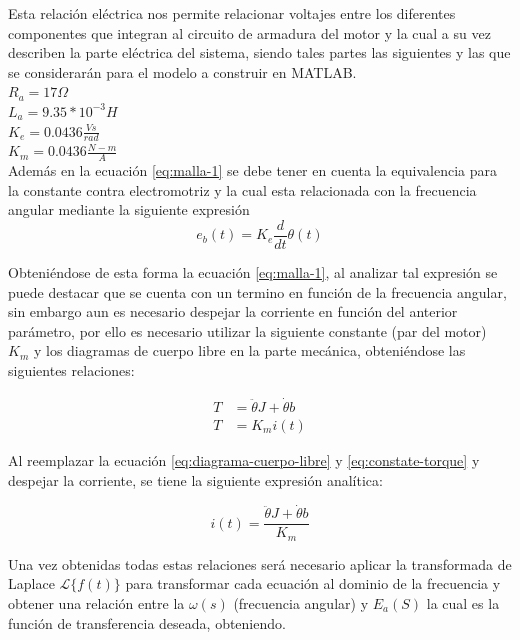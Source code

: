 \documentclass[conference]{IEEEtran}
\begin{document}
	Esta relación eléctrica nos permite relacionar voltajes entre los diferentes componentes que integran al circuito de armadura del motor y la cual a su vez describen la parte eléctrica del sistema, siendo tales partes las siguientes y las que se considerarán para el modelo a construir en MATLAB. \\
	
	$R_a = 17 \Omega$ \\
	$L_a = 9.35*10^{-3} H$ \\
	$K_e = 0.0436 \frac{Vs}{rad}$ \\
	$K_m = 0.0436 \frac{N-m}{A}$ \\
	
	Además en la ecuación \ref{eq:malla-1} se debe tener en cuenta la equivalencia para la constante contra electromotriz y la cual esta relacionada con la frecuencia angular mediante la siguiente expresión
	\begin{equation}
		e_b(t) = K_e\frac{d}{dt} \theta(t)
		\label{eq:contra-electromotriz}
	\end{equation}
	
	Obteniéndose de esta forma la ecuación \ref{eq:malla-1}, al analizar tal expresión se puede destacar que se cuenta con un termino en función de la frecuencia angular, sin embargo aun es necesario despejar la corriente en función del anterior parámetro, por ello es necesario utilizar la siguiente constante (par del motor) $K_m$ y los diagramas de cuerpo libre en la parte mecánica, obteniéndose las siguientes relaciones:
	
	\begin{align}
		T &= \ddot{\theta}J + \dot{\theta}b \label{eq:diagrama-cuerpo-libre}\\ 
		T &= K_mi(t) \label{eq:constate-torque}
	\end{align}
	
	Al reemplazar la ecuación \ref{eq:diagrama-cuerpo-libre} y \ref{eq:constate-torque} y despejar la corriente, se tiene la siguiente expresión analítica:
	
	\begin{equation}
		i(t) = \frac{ \ddot{\theta}J + \dot{\theta}b }{ K_m }
		\label{eq:corriente-torque}
	\end{equation}
	
	Una vez obtenidas todas estas relaciones será necesario aplicar la transformada de Laplace $\mathcal{L}\{f(t)\}$ para transformar cada ecuación al dominio de la frecuencia y obtener una relación entre la $\omega(s)$ (frecuencia angular) y $E_a(S)$ la cual es la función de transferencia deseada, obteniendo.
	
\end{document}
